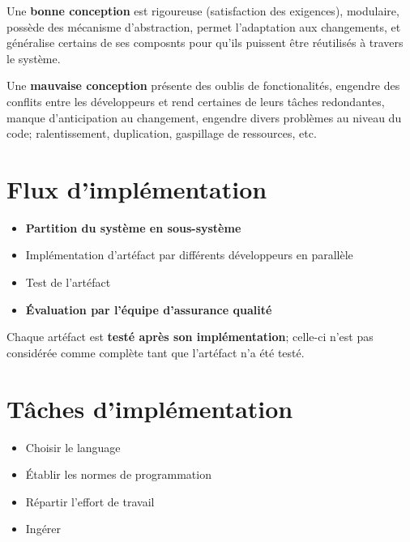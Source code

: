 \documentclass[16pt]{report}
\begin{document}
\begin{multicols*}{2}
    \begin{note}{}{}
        Une \textbf{bonne conception} est rigoureuse (satisfaction des exigences), modulaire, 
        possède des mécanisme d'abstraction, permet l'adaptation aux changements, et généralise certains 
        de ses composnts pour qu'ils puissent être réutilisés à travers le système. 
    \end{note}

    Une \textbf{mauvaise conception}  présente des oublis de fonctionalités, engendre des conflits 
    entre les développeurs et rend certaines de leurs tâches redondantes, manque d'anticipation au 
    changement, engendre divers problèmes au niveau du code; ralentissement, duplication, gaspillage de ressources, 
    etc. 

    \section{Flux d'implémentation}

    \begin{itemize}
        \item \textbf{Partition du système en sous-système}  
        \item Implémentation d'artéfact par différents développeurs en parallèle 
        \item Test de l'artéfact 
        \item \textbf{Évaluation par l'équipe d'assurance qualité}  
    \end{itemize}

    \begin{note}{}{}
        Chaque artéfact est \textbf{testé après son implémentation}; celle-ci n'est pas considérée comme 
        complète tant que l'artéfact n'a été testé. 
    \end{note}                          
            
    \section{Tâches d'implémentation}

    \begin{itemize}
        \item Choisir le language 
        \item Établir les normes de programmation 
        \item Répartir l'effort de travail 
        \item Ingérer
    \end{itemize}


\end{multicols*}
\end{document}
